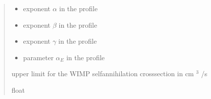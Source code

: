 \documentclass[letterpaper,10pt,english]{sphinxmanual}
\begin{document}
\begin{fulllineitems}
\begin{quote}
\begin{description}
\begin{itemize}
\item {} 
\sphinxAtStartPar
{} \textendash{} exponent \(\alpha\) in the {\hyperref[\detokenize{diffsph.profiles:diffsph.profiles.templates.hdz}]{}} profile

\item {} 
\sphinxAtStartPar
{} \textendash{} exponent \(\beta\) in the {\hyperref[\detokenize{diffsph.profiles:diffsph.profiles.templates.hdz}]{}} profile

\item {} 
\sphinxAtStartPar
{} \textendash{} exponent \(\gamma\) in the {\hyperref[\detokenize{diffsph.profiles:diffsph.profiles.templates.hdz}]{}} profile

\item {} 
\sphinxAtStartPar
{} \textendash{} parameter \(\alpha_E\) in the {\hyperref[\detokenize{diffsph.profiles:diffsph.profiles.templates.enst}]{}} profile

\end{itemize}

\sphinxAtStartPar
upper limit for the WIMP self\sphinxhyphen{}annihilation cross\sphinxhyphen{}section in cm \({}^3\) /s

\sphinxAtStartPar
float

\end{description}\end{quote}

\end{fulllineitems}

\end{document}
